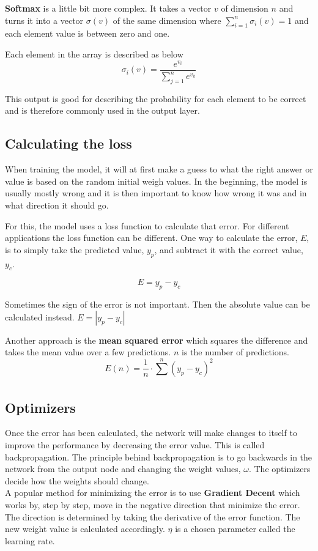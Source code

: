 \textbf{Softmax} is a little bit more complex. It takes a vector $v$ of dimension $n$ and turns it into a vector $\sigma(v)$ of the same dimension where $\displaystyle\sum_{i=1}^{n} \sigma_i(v) = 1 $ and each element value is between zero and one.

Each element in the array is described as below
\[ \sigma_i(v) = \frac{e^{v_i}}{\displaystyle\sum_{j=1}^{n} e^{v_k}} \]

This output is good for describing the probability for each element to be correct and is therefore commonly used
in the output layer.

\subsection{Calculating the loss}
When training the model, it will at first make a guess to what the right answer or value is based on the random initial weigh values. In the beginning, the model is usually mostly wrong and it is then important to know how wrong it was and in what direction it should go.

For this, the model uses a loss function to calculate that error. For different applications the loss function can be different.
One way to calculate the error, $E$, is to simply take the predicted value, $y_p$, and subtract it with the correct value, $y_c$.

\[E = y_p - y_c\]

Sometimes the sign of the error is not important. Then the absolute value can 
be calculated instead. $E = |y_p - y_c| $

Another approach is the \textbf{mean squared error} which squares the difference and takes the mean value over a few predictions. $n$ is the number of predictions.
\[E(n) = \frac{1}{n} \cdot \displaystyle\sum_{}^{n} (y_p - y_c)^{2} \]

\subsection{Optimizers}
\label{subSec:optimizers}
Once the error has been calculated, the network will make changes to itself to improve the performance by decreasing the error value. This is called backpropagation.
The principle behind backpropagation is to go backwards in the network from the output node and changing the weight values, $ \omega $.
The optimizers decide how the weights should change. \\

A popular method for minimizing the error is to use \textbf{Gradient Decent} which works
by, step by step, move in the negative direction that minimize the error.
The direction is determined by taking the derivative of the error function.
The new weight value is calculated accordingly. $\eta$ is a chosen parameter called the learning rate.

